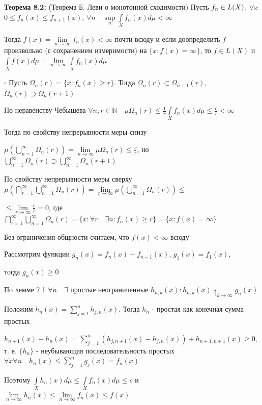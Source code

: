 \documentclass[a4paper]{report}
\newcommand*{\hm}[1]{#1\nobreak\discretionary{}%
            {\hbox{$\mathsurround=0pt #1$}}{}}
\begin{document}
\noindent\textbf{Теорема 8.2:} (Теорема Б. Леви о монотонной сходимости) Пусть $f_n\hm\in L(X)$, $\forall x$ $0\le f_n(x)\le f_{n+1}(x)$, $\forall n\quad\sup\limits_n
\displaystyle\int\limits_X f_n(x)d\mu<\infty$

Тогда $f(x)=\lim\limits_{n\to\infty}f_n(x)<\infty$ почти всюду и если доопределить $f$ произвольно (с сохранением измеримости) на $\{x\colon f(x)=\infty\}$, то $f\in L(X)$ и $\displaystyle\int\limits_X f(x)d\mu=\lim\limits_{n\to\infty}\displaystyle\int\limits_X f_n(x)d\mu$

\noindent $\square$ Пусть $\Omega_n(r)=\{x\colon f_n(x)\ge r\}$. Тогда $\Omega_n(r)\subset\Omega_{n+1}(r)$, $\Omega_n(r)\supset\Omega_n(r+1)$

По неравенству Чебышева $\forall n,r\in\mathbb N\quad \mu\Omega_n(r)\le\displaystyle\frac1r\displaystyle\int\limits_X f_n(x)d\mu\le\frac{c}{r}<\infty$

Тогда по свойству непрерывности меры снизу 

$\mu\left(\bigcup\limits_{n=1}^\infty\Omega_n(r)\right)=\lim\limits_{n\to\infty}\mu\Omega_n(r)\le\frac{c}{r}$, но $\bigcup\limits_{n=1}^\infty\Omega_n(r)\supset\bigcup\limits_{n=1}^\infty\Omega_n(r+1)$

По свойству непрерывности меры сверху $\mu\left(\bigcap\limits_{r=1}^\infty \bigcup\limits_{n=1}^\infty \Omega_n(r)\right)=\lim\limits_{r\to\infty}\mu\left(\bigcup\limits_{n=1}^\infty\Omega_n(r)\right)\le$

\noindent $\le\lim\limits_{r\to\infty}\frac{c}{r}=0$, где $\bigcap\limits_{r=1}^\infty\bigcup\limits_{n=1}^\infty \Omega_n(r)=\{x\colon\forall r\quad\exists n\colon f_n(x)\ge r\}=\{x\colon f(x)=\infty\}$

Без ограничения общности считаем, что $f(x)<\infty$ всюду

 Рассмотрим функции $g_n(x)=f_n(x)-f_{n-1}(x)$, $g_1(x)=f_1(x)$, 

тогда $g_n(x)\ge0$

По лемме 7.1 $\forall n\quad \exists$ простые неограниченные $h_{n,k}(x)\colon h_{n,k}(x)\uparrow_{k\to\infty}g_n(x)$

Положим $h_n(x)=\sum\limits_{j=1}^n h_{j,n}(x)$. Тогда $h_n$ - простая как конечная сумма простых

$h_{n+1}(x)-h_n(x)=\sum\limits_{j=1}^n\left(h_{j,n+1}(x)-h_{j,n}(x)\right)+h_{n+1,n+1}(x)\ge0$, т. е. $\{h_n\}$ -  неубывающая последовательность простых $\forall x\forall n\quad h_n(x)\le\sum\limits_{j=1}^n g_j(x)=f_n(x)$

Поэтому $\displaystyle\int\limits_X h_n(x)d\mu\le\displaystyle\int\limits_X f_n(x) d\mu\le c$ и $\lim\limits_{n\to\infty} h_n(x)\le\lim\limits_{n\to\infty}f_n(x)\le f(x)$
\end{document}
